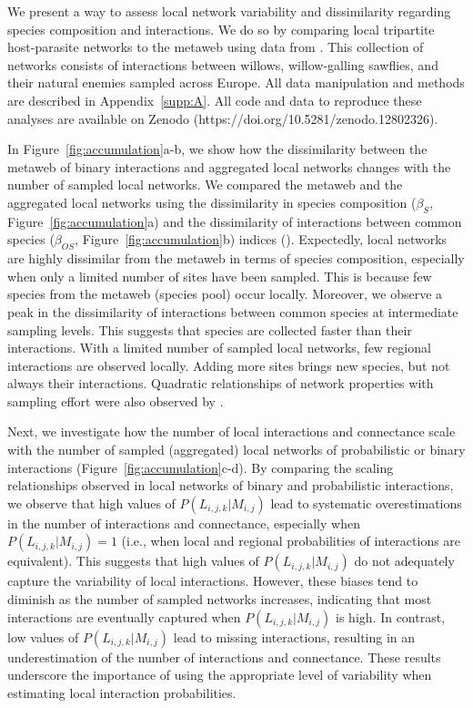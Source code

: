 \begin{box2.2}

We present a way to assess local network variability and dissimilarity regarding
species composition and interactions. We do so by comparing local tripartite
host-parasite networks to the metaweb using data from \textcite{Kopelke2017Foodweb}.
This collection of networks consists of interactions between willows,
willow-galling sawflies, and their natural enemies sampled across Europe. All
data manipulation and methods are described in Appendix~\ref{supp:A}. All code
and data to reproduce these analyses are available on Zenodo
(https://doi.org/10.5281/zenodo.12802326).

In Figure~\ref{fig:accumulation}a-b, we show how the dissimilarity between the
metaweb of binary interactions and aggregated local networks changes with the
number of sampled local networks. We compared the metaweb and the aggregated
local networks using the dissimilarity in species composition ($\beta_{S}$,
Figure~\ref{fig:accumulation}a) and the dissimilarity of interactions between
common species ($\beta_{OS}$, Figure~\ref{fig:accumulation}b) indices
(\cite{Poisot2012Dissimilarity}). Expectedly, local networks are highly
dissimilar from the metaweb in terms of species composition, especially when
only a limited number of sites have been sampled. This is because few species
from the metaweb (species pool) occur locally. Moreover, we observe a peak in
the dissimilarity of interactions between common species at intermediate
sampling levels. This suggests that species are collected faster than their
interactions. With a limited number of sampled local networks, few regional
interactions are observed locally. Adding more sites brings new species, but not
always their interactions. Quadratic relationships of network properties with
sampling effort were also observed by \textcite{McLeod2021Sampling}.

Next, we investigate how the number of local interactions and connectance
scale with the number of sampled (aggregated) local networks of probabilistic
or binary interactions (Figure~\ref{fig:accumulation}c-d). By comparing the scaling
relationships observed in local networks of binary and probabilistic
interactions, we observe that high values of $P(L_{i, j, k}|M_{i, j})$ lead to
systematic overestimations in the number of interactions and connectance,
especially when $P(L_{i, j, k}|M_{i, j}) = 1$ (i.e., when local and regional
probabilities of interactions are equivalent). This suggests that high values
of $P(L_{i, j, k}|M_{i, j})$ do not adequately capture the variability of
local interactions. However, these biases tend to diminish as the number of
sampled networks increases, indicating that most interactions are eventually
captured when $P(L_{i, j, k}|M_{i, j})$ is high. In contrast, low values of
$P(L_{i, j, k}|M_{i, j})$ lead to missing interactions, resulting in an
underestimation of the number of interactions and connectance. These results
underscore the importance of using the appropriate level of variability when
estimating local interaction probabilities.

\end{box2.2}

